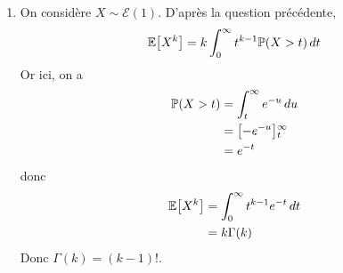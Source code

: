 {\begin{td-sol}[]
\begin{enumerate}
            \item On considère \(X \sim \mathcal E(1)\). D'après la question précédente,
            \begin{equation*}
                \mathbb{E}\mathopen{}\left[X^k\right]\mathclose{} = k \int_{0}^\infty t^{k-1} \mathbb{P}(X>t) \mathop{}\!{d} t
            \end{equation*}
            Or ici, on a
            \begin{equation*}
                \begin{aligned}
                    \mathbb{P}(X>t) 
                    &= \int_t^\infty e^{-u} \mathop{}\!{d} u\\
                    &= \mathopen{}\left[-e^{-u}\right]\mathclose{}_t^\infty\\
                    &= e^{-t}
                \end{aligned}
            \end{equation*}
            donc
            \begin{equation*}
                \begin{aligned}
                    \mathbb{E}\mathopen{}\left[X^k\right]\mathclose{}
                    &= \int_{0}^\infty t^{k-1} e^{-t} \mathop{}\!{d} t\\
                    &= k \Gamma(k)
                \end{aligned}
            \end{equation*}
            Donc \(\Gamma(k) = (k-1)!\).
        \end{enumerate}
    \end{td-sol}
}{}

